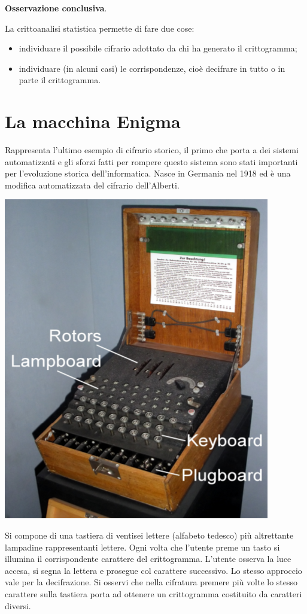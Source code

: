 \begin{framed}
	\noindent \textbf{Osservazione conclusiva}. 
	
	\noindent La crittoanalisi statistica permette di fare due cose:
	\begin{itemize}
		\item individuare il possibile cifrario adottato da chi ha generato il crittogramma;
		\item individuare (in alcuni casi) le corrispondenze, cioè decifrare in tutto o in parte il crittogramma.
	\end{itemize}
\end{framed} 

\chapter{La macchina Enigma}
Rappresenta l'ultimo esempio di cifrario storico, il primo che porta a dei sistemi automatizzati e gli sforzi fatti per rompere questo sistema sono stati importanti per l'evoluzione storica dell'informatica. Nasce in Germania nel 1918 ed è una modifica automatizzata del cifrario dell'Alberti.
\begin{center}
	\includegraphics[scale=.55]{images/14.PNG}
\end{center}
Si compone di una tastiera di ventisei lettere (alfabeto tedesco) più altrettante lampadine rappresentanti lettere. Ogni volta che l'utente preme un tasto si illumina il corrispondente carattere del crittogramma. L'utente osserva la luce accesa, si segna la lettera e prosegue col carattere successivo. Lo stesso approccio vale per la decifrazione. Si osservi che nella cifratura premere più volte lo stesso carattere sulla tastiera porta ad ottenere un crittogramma costituito da caratteri diversi.
